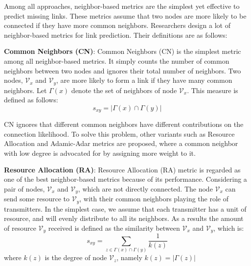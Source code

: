 \documentclass[\main/thesis.tex]{subfiles}
\begin{document}
Among all approaches, neighbor-based metrics are the simplest yet effective to predict missing links. These metrics assume that two nodes are more likely to be connected if they have more common neighbors. Researchers design a lot of neighbor-based metrics for link prediction. Their definitions are as follows:

\textbf{Common Neighbors (CN)}: Common Neighbors (CN) \cite{newman2001clustering} is the simplest metric among all neighbor-based metrics. It simply counts the number of common neighbors between two nodes and ignores their total number of neighbors. Two nodes, $\mathcal{V}_x$ and $\mathcal{V}_y$, are more likely to form a link if they have many common neighbors. Let $\Gamma(x)$ denote the set of neighbors of node $\mathcal{V}_x$. This measure is defined as follows:
\begin{equation}
s_{xy}=|\Gamma(x)\cap\Gamma(y)| \label{CN-previous}
\end{equation}

CN ignores that different common neighbors have different contributions on the connection likelihood. To solve this problem, other variants such as Resource Allocation and Adamic-Adar metrics are proposed, where a common neighbor with low degree is advocated for by assigning more weight to it. 

\textbf{Resource Allocation (RA)}: Resource Allocation (RA) \cite{zhou2009predicting} metric is regarded as one of the best neighbor-based metrics because of its performance. Considering a pair of nodes, $\mathcal{V}_x$ and $\mathcal{V}_y$, which are not directly connected. The node $\mathcal{V}_x$ can send some resource to $\mathcal{V}_y$, with their common neighbors playing the role of transmitters. In the simplest case, we assume that each transmitter has a unit of resource, and will evenly distribute to all its neighbors. As a results the amount of resource $\mathcal{V}_y$ received is defined as the similarity
between $\mathcal{V}_x$ and $\mathcal{V}_y$, which is:
\begin{equation}
s_{xy}=\sum_{z\in \Gamma(x)\cap\Gamma(y)}\frac{1}{k(z)}
\end{equation}
where $k(z)$ is the degree of node $\mathcal{V}_z$, namely $k(z) = |\Gamma(z)|$
\end{document}
